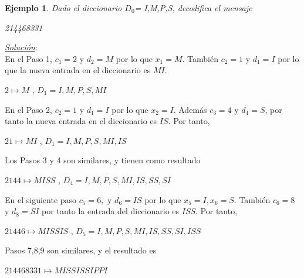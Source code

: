 \documentclass{beamer}
\theoremstyle{plain}
\theoremstyle{example}
\theoremstyle{example}
\newtheorem{ejemplo} [Ejemplo] {Ejemplo}
\begin{document}
\begin{frame}  \small 

\begin{ejemplo}
Dado el diccionario $D_0$= I,M,P,S, decodifica el mensaje

\begin{center}
214468331
\end{center} 
\end{ejemplo}
\pause
\textit{\underline{Solución}}:\\

En el Paso 1, $c_1 =2$ y $d_2 = M$ por lo que $x_1=M$. También $c_2=1$ y $d_1=I$ por lo que la nueva entrada en el diccionario es $MI$.

\begin{center}
$2 \mapsto M$ ,	$D_1 = I , M , P , S , MI $
\end{center}

En el Paso 2, $c_2=1$ y $d_1=I$ por lo que $x_2=I$. Además $c_3 = 4$ y $d_4=S$, por tanto la nueva entrada en el diccionario es $IS$. Por tanto,

\begin{center}
$2 1\mapsto MI$ ,	$D_1 = I , M , P , S , MI, IS $
\end{center}
\end{frame} 
	
\begin{frame}  \small 	
Los Pasos 3 y 4 son similares, y tienen como resultado 

\begin{center}
$2 1 4 4\mapsto MISS$ ,	$D_4 = I , M , P , S , MI, IS, SS, SI $
\end{center}

En el siguiente paso $c_5=6,$ y $d_6=IS$ por lo que $x_5=I, x_6=S.$ También $c_6=8$ y $d_8=SI$ por tanto la entrada del diccionario es $ISS$.
Por tanto,

\begin{center}
$2 1 4 4 6\mapsto MISSIS$ ,	$D_5 = I , M , P , S , MI, IS, SS, SI, ISS $
\end{center}

Pasos 7,8,9 son similares, y el resultado es  

\begin{center}
$2 1 4 4 6 8 3 3 1 \mapsto MISSISSIPPI$
\end{center}


\end{frame} 
\end{document}

